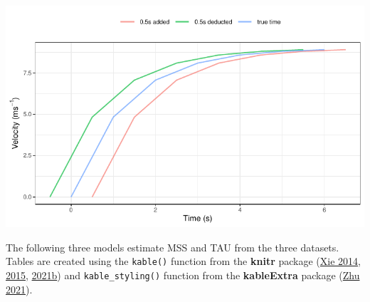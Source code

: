 \documentclass[fleqn,10pt]{wlpeerj} %
\begin{document}
\begin{center}\includegraphics[width=0.9\linewidth]{paper_files/figure-latex/unnamed-chunk-19-1} \end{center}

\normalsize

The following three models estimate MSS and TAU from the three datasets. Tables are created using the \texttt{kable()} function from the \textbf{knitr} package (\protect\hyperlink{ref-knitr2014}{Xie 2014}, \protect\hyperlink{ref-knitr2015}{2015}, \protect\hyperlink{ref-R-knitr}{2021b}) and \texttt{kable\_styling()} function from the \textbf{kableExtra} package (\protect\hyperlink{ref-R-kableExtra}{Zhu 2021}).

\small
\end{document}
